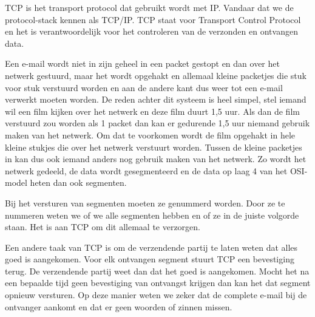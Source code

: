 TCP is het transport protocol dat gebruikt wordt met IP. Vandaar dat we de protocol-stack kennen als TCP/IP. TCP staat voor Transport Control Protocol en het is verantwoordelijk voor het controleren van de verzonden en ontvangen data.

Een e-mail wordt niet in zijn geheel in een packet gestopt en dan over het netwerk gestuurd, maar het wordt opgehakt en allemaal kleine packetjes die stuk voor stuk verstuurd worden en aan de andere kant dus weer tot een e-mail verwerkt moeten worden. De reden achter dit systeem is heel simpel, stel iemand wil een film kijken over het netwerk en deze film duurt 1,5 uur. Als dan de film verstuurd zou worden als 1 packet dan kan er gedurende 1,5 uur niemand gebruik maken van het netwerk. Om dat te voorkomen wordt de film opgehakt in hele kleine stukjes die over het netwerk verstuurt worden. Tussen de kleine packetjes in kan dus ook iemand anders nog gebruik maken van het netwerk. Zo wordt het netwerk gedeeld, de data wordt gesegmenteerd en de data op laag 4 van het OSI-model heten dan ook segmenten.

Bij het versturen van segmenten moeten ze genummerd worden. Door ze te nummeren weten we of we alle segmenten hebben en of ze in de juiste volgorde staan. Het is aan TCP om dit allemaal te verzorgen.

Een andere taak van TCP is om de verzendende partij te laten weten dat alles goed is aangekomen. Voor elk ontvangen segment stuurt TCP een bevestiging terug. De verzendende partij weet dan dat het goed is aangekomen. Mocht het na een bepaalde tijd geen bevestiging van ontvangst krijgen dan kan het dat segment opnieuw versturen. Op deze manier weten we zeker dat de complete e-mail bij de ontvanger aankomt en dat er geen woorden of zinnen missen.
